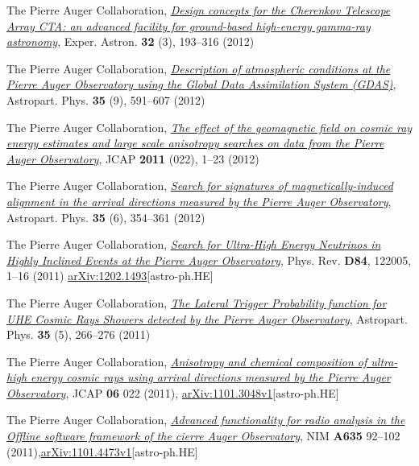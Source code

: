 \documentclass[11pt, a4paper]{article}
\newcommand{\years}[1]{\marginnote{\scriptsize #1}}
\begin{document}
\years{2012}The Pierre Auger Collaboration,
\href{http://dx.doi.org/10.1007/s10686-011-9247-0}{\emph{Design concepts for
the Cherenkov Telescope Array CTA: an advanced facility for ground-based
high-energy gamma-ray astronomy}}, Exper. Astron. {\bf{32}} (3), 193--316
(2012)

\years{2012}The Pierre Auger Collaboration, 
\href{http://dx.doi.org/10.1016/j.astropartphys.2011.12.002}{\emph{Description
of atmospheric conditions at the Pierre Auger Observatory using the Global Data
Assimilation System (GDAS)}}, Astropart. Phys. {\bf{35}} (9), 591--607 (2012)

\years{2012}The Pierre Auger Collaboration, 
\href{http://dx.doi.org/10.1088/1475-7516/2011/11/022}{\emph{The effect of the
geomagnetic field on cosmic ray energy estimates and large scale anisotropy
searches on data from the Pierre Auger Observatory}}, JCAP {\bf{2011}} (022),
1--23 (2012)

\years{2012}The Pierre Auger Collaboration, 
\href{http://dx.doi.org/10.1016/j.astropartphys.2011.10.004}{\emph{Search for
signatures of magnetically-induced alignment in the arrival directions measured
by the Pierre Auger Observatory}}, Astropart. Phys. {\bf{35}} (6), 354--361
(2012)

\years{2011}The Pierre Auger Collaboration,
\href{http://dx.doi.org/10.1016/10.1103/PhysRevD.84.122005}{\emph{Search for
Ultra-High Energy Neutrinos in Highly Inclined Events at the Pierre Auger
Observatory}}, Phys.  Rev. {\bf D84}, 122005, 1--16 (2011)
\href{http://arxiv.org/abs/1202.1493}{arXiv:1202.1493}[astro-ph.HE]

\years{2011}The Pierre Auger Collaboration, 
\href{http://dx.doi.org/10.1016/j.astropartphys.2011.08.001}{\emph{The Lateral
Trigger Probability function for UHE Cosmic Rays Showers detected by the Pierre
Auger Observatory}}, Astropart. Phys. {\bf{35}} (5), 266--276 (2011)

\years{2011}The Pierre Auger Collaboration,
\href{http://dx.doi.org/10.1088/1475-7516/2011/06/022}{\emph{Anisotropy and
chemical composition of ultra-high energy cosmic rays using arrival directions
measured by the Pierre Auger Observatory}}, JCAP {\bf 06} 022 (2011),
\href{http://arxiv.org/abs/1106.3048}{arXiv:1101.3048v1}[astro-ph.HE]

\years{2011}The Pierre Auger Collaboration,
\href{http://dx.doi.org/10.1016/j.nima.2011.01.049}{{\emph{Advanced
functionality for radio analysis in the Offline software framework of the
cierre Auger Observatory}}}, NIM {\bf A635} 92--102
(2011),\href{http://arxiv.org/abs/1101.4473}{arXiv:1101.4473v1}[astro-ph.HE]
\end{document}
